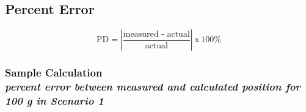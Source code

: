 %
%
%

\subsection{Percent Error}
\vspace{0.5cm}
\begin{equation}
	\text{PD}	= \left| \frac{\text{measured - actual}}{\text{actual}} \right|\: \text{x}\: 100\%
	\label{eq:perror}
\end{equation}

\subsubsection{Sample Calculation \\ {\normalfont \small\textit{percent error between measured and calculated position for 100 g in Scenario 1}}}

